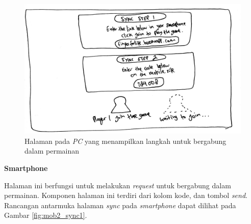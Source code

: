 \begin{enumerate}
\begin{figure}[H]
	\centering
	\includegraphics[scale=0.1]{Gambar/web2_sync}
	\caption{Halaman pada \textit{PC} yang menampilkan langkah untuk bergabung dalam permainan}
	\label{fig:web2_sync}
\end{figure}

	\textbf{Smartphone}
	
	Halaman ini berfungsi untuk melakukan \textit{request} untuk bergabung dalam permainan. Komponen halaman ini terdiri dari kolom kode, dan tombol \textit{send}. Rancangan antarmuka halaman \textit{sync} pada \textit{smartphone} dapat dilihat pada Gambar \ref{fig:mob2_sync1}.
	

\end{enumerate}
